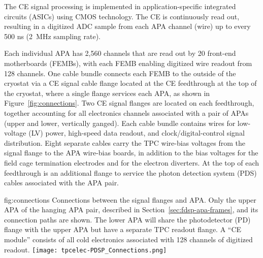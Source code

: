The CE signal processing is implemented in application-specific integrated circuits (ASICs)
using CMOS technology.  The CE is continuously read out, resulting in a digitized ADC
sample from each APA channel (wire) up to every 500 ns (2~MHz sampling rate).

Each individual APA has 2,560 channels that are read out by 20 front-end motherboards (FEMBs), with
each FEMB enabling digitized wire readout from 128 channels.  One cable bundle connects each FEMB to
the outside of the cryostat via a CE signal cable flange located at the CE feedthrough at the
top of the cryostat, where a single flange services each APA, as shown in Figure~\ref{fig:connections}.  Two CE signal flanges are located on each feedthrough, together accounting for all electronics channels associated with a pair of APAs (upper and lower, vertically ganged).
Each cable bundle contains wires for low-voltage (LV) power, high-speed data readout, and
clock/digital-control signal distribution.  Eight separate cables carry the TPC wire-bias voltages
from the signal flange to the APA wire-bias boards, in addition to the bias voltages for the field
cage termination electrodes and for the electron diverters.  At the top of each feedthrough is an additional flange to service the photon detection system (PDS) cables associated with the APA pair.

\begin{dunefigure}
{fig:connections}
{Connections between the signal flanges and APA. Only the upper APA of the hanging APA pair, described in Section~\ref{sec:fdsp-apa-frames}, and its connection paths are shown. The lower APA will share the photodetector (PD) flange with the upper APA but have a separate TPC readout flange. A ``CE module'' consists of all cold electronics associated with 128 channels of digitized readout.}
\hspace{1cm}
\texttt{[image: tpcelec-PDSP\_Connections.png]}
\end{dunefigure}

